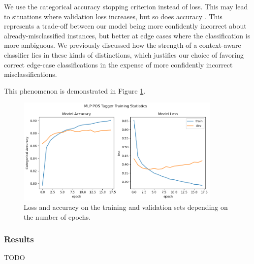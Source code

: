 \documentclass[11pt, a4paper]{article}
\begin{document}
	We use the categorical accuracy stopping criterion instead of loss. This may lead to situations where validation loss increases, but so does accuracy \cite{loss-accuracy}. This represents a trade-off between our model being more confidently incorrect about already-misclassified instances, but better at edge cases where the classification is more ambiguous. We previously discussed how the strength of a context-aware classifier lies in these kinds of distinctions, which justifies our choice of favoring correct edge-case classifications in the expense of more confidently incorrect misclassifications.
	
	This phenomenon is demonstrated in Figure \ref{fig::ex_10_fit}.
	
	\begin{figure}
		\centering
		\includegraphics[width=10cm]{"ex_10_fit.png"}
		\caption{Loss and accuracy on the training and validation sets depending on the number of epochs.}
		\label{fig::ex_10_fit}
	\end{figure}
	
	\subsubsection{Results}
	
	TODO
	
	\printbibliography
	
\end{document}
